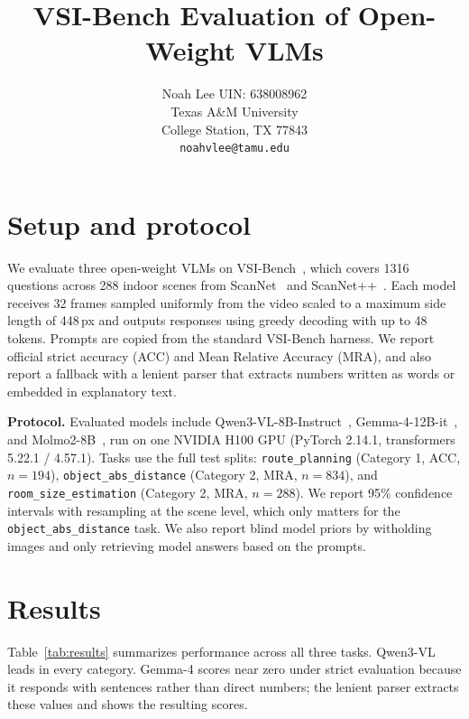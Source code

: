 \documentclass{article}
\title{VSI-Bench Evaluation of Open-Weight VLMs}
\author{%
  Noah Lee \quad UIN: 638008962 \\
  Texas A\&M University \\
  College Station, TX 77843 \\
  \texttt{noahvlee@tamu.edu}
}
\begin{document}
\small
\maketitle
\vspace{-16mm}

\section{Setup and protocol}
We evaluate three open-weight VLMs on VSI-Bench~\citep{yang2025thinking}, which covers 1316 questions across
288 indoor scenes from ScanNet~\citep{dai2017scannet} and ScanNet++~\citep{yeshwanth2023scannetpp}. Each model receives 32 frames sampled uniformly from
the video scaled to a maximum side length of 448\,px and outputs responses
using greedy decoding with up to 48 tokens. Prompts are copied from the standard VSI-Bench harness.
We report official strict accuracy (ACC) and Mean Relative Accuracy (MRA), and also report a fallback with a lenient parser
that extracts numbers written as words or embedded in explanatory text.

\vspace{2pt}
\noindent\textbf{Protocol.} Evaluated models include Qwen3-VL-8B-Instruct~\citep{qwen2025qwen3vl}, Gemma-4-12B-it~\citep{gemma2026gemma4}, and
Molmo2-8B~\citep{dietke2025molmo}, run on one NVIDIA H100 GPU (PyTorch 2.14.1, transformers 5.22.1 / 4.57.1).
Tasks use the full test splits: \texttt{route\_planning} (Category 1, ACC, $n{=}194$),
\texttt{object\_abs\_distance} (Category 2, MRA, $n{=}834$), and \texttt{room\_size\_estimation}
(Category 2, MRA, $n{=}288$). We report 95\% confidence intervals with resampling at the scene level, which only matters
for the \texttt{object\_abs\_distance} task. We also report blind model priors by witholding images and only retrieving model
answers based on the prompts.

\section{Results}
Table~\ref{tab:results} summarizes performance across all three tasks. Qwen3-VL leads in every
category. Gemma-4 scores near zero under strict evaluation because it responds with sentences
rather than direct numbers; the lenient parser extracts these values and shows the resulting scores.
\end{document}

